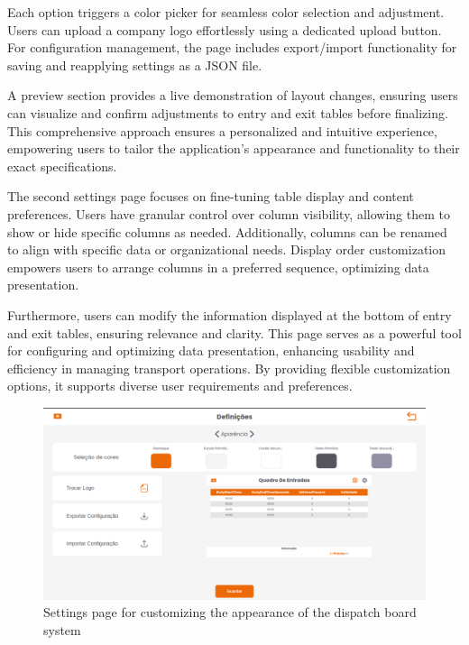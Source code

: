 \documentclass[10pt]{article}
\begin{document}
        Each option triggers a color picker for seamless color selection and adjustment.
        Users can upload a company logo effortlessly using a dedicated upload button. For configuration management, the page includes export/import functionality for saving and reapplying settings as a JSON file. 
        
        A preview section provides a live demonstration of layout changes, ensuring users can visualize and confirm adjustments to entry and exit tables before finalizing.
        This comprehensive approach ensures a personalized and intuitive experience, empowering users to tailor the application's appearance and functionality to their exact specifications.
        
        The second settings page focuses on fine-tuning table display and content preferences. Users have granular control over column visibility, allowing them to show or hide specific columns as needed. Additionally, columns can be renamed to align with specific data or organizational needs.
        Display order customization empowers users to arrange columns in a preferred sequence, optimizing data presentation. 
        
        Furthermore, users can modify the information displayed at the bottom of entry and exit tables, ensuring relevance and clarity.
        This page serves as a powerful tool for configuring and optimizing data presentation, enhancing usability and efficiency in managing transport operations. By providing flexible customization options, it supports diverse user requirements and preferences.

        \vfill
        \begin{figure}[htbp!]
            \centering
            \includegraphics[width=1\textwidth]{aparencia}
            \caption{Settings page for customizing the appearance of the dispatch board system}
            \label{fig:settings_appearance}
        \end{figure}
        \vfill
\end{document}
